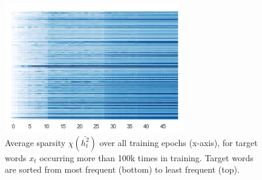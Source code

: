 \begin{figure}\centering
\includegraphics[width=0.7\textwidth]{sparsity/gradient_target.png}
\caption{Average sparsity $\chi(\bar{h_t^2})$ over all training epochs (x-axis), for target words $x_{t}$ occurring more than 100k times in training. Target words are sorted from most frequent (bottom) to least frequent (top).}
 \label{fig:rnn_out_concentration}
\end{figure}


